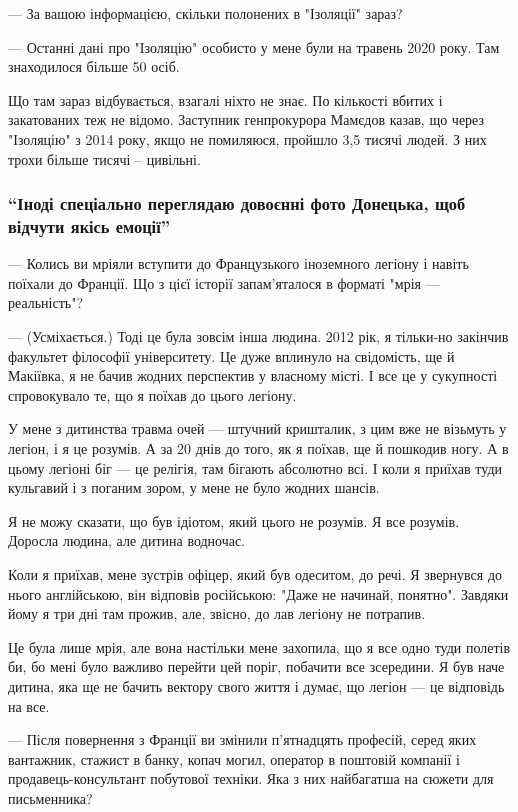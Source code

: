 — За вашою інформацією, скільки полонених в "Ізоляції" зараз?

— Останні дані про "Ізоляцію" особисто у мене були на травень 2020 року. Там
знаходилося більше 50 осіб.

Що там зараз відбувається, взагалі ніхто не знає. По кількості вбитих і
закатованих теж не відомо. Заступник генпрокурора Мамєдов казав, що через
"Ізоляцію" з 2014 року, якщо не помиляюся, пройшло 3,5 тисячі людей. З них
трохи більше тисячі – цивільні.

\subsubsection{\enquote{Іноді спеціально переглядаю довоєнні фото Донецька, щоб відчути якісь емоції}}

— Колись ви мріяли вступити до Французького іноземного легіону і навіть поїхали
до Франції. Що з цієї історії запам'яталося в форматі "мрія — реальність"?

— (Усміхається.) Тоді це була зовсім інша людина. 2012 рік, я тільки-но
закінчив факультет філософії університету. Це дуже вплинуло на свідомість, ще й
Макіївка, я не бачив жодних перспектив у власному місті. І все це у сукупності
спровокувало те, що я поїхав до цього легіону.

У мене з дитинства травма очей — штучний кришталик, з цим вже не візьмуть у
легіон, і я це розумів. А за 20 днів до того, як я поїхав, ще й пошкодив ногу.
А в цьому легіоні біг — це релігія, там бігають абсолютно всі. І коли я приїхав
туди кульгавий і з поганим зором, у мене не було жодних шансів.

Я не можу сказати, що був ідіотом, який цього не розумів. Я все розумів.
Доросла людина, але дитина водночас.

Коли я приїхав, мене зустрів офіцер, який був одеситом, до речі. Я звернувся до
нього англійською, він відповів російською: "Даже не начинай, понятно". Завдяки
йому я три дні там прожив, але, звісно, до лав легіону не потрапив.

Це була лише мрія, але вона настільки мене захопила, що я все одно туди полетів
би, бо мені було важливо перейти цей поріг, побачити все зсередини. Я був наче
дитина, яка ще не бачить вектору свого життя і думає, що легіон — це відповідь
на все.

— Після повернення з Франції ви змінили п'ятнадцять професій, серед яких
вантажник, стажист в банку, копач могил, оператор в поштовій компанії і
продавець-консультант побутової техніки. Яка з них найбагатша на сюжети для
письменника?

